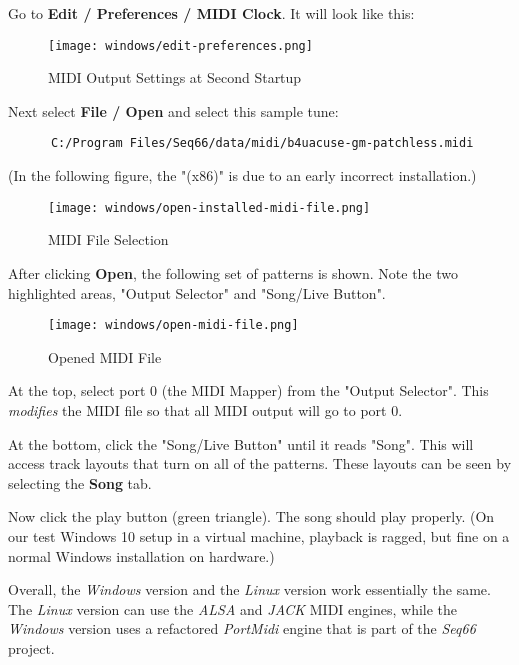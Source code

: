    Go to \textbf{Edit / Preferences / MIDI Clock}.
   It will look like this:

\begin{figure}[H]
   \centering 
   \texttt{[image: windows/edit-preferences.png]}
   \caption{MIDI Output Settings at Second Startup}
   \label{fig:windows_output_settings_second_startup}
\end{figure}

   Next select \textbf{File / Open} and select this sample tune:

   \begin{verbatim}
      C:/Program Files/Seq66/data/midi/b4uacuse-gm-patchless.midi
   \end{verbatim}

   (In the following figure, the "(x86)" is due to an early incorrect
   installation.)

\begin{figure}[H]
   \centering 
   \texttt{[image: windows/open-installed-midi-file.png]}
   \caption{MIDI File Selection}
   \label{fig:windows_open_installed_midi_file}
\end{figure}

   After clicking \textbf{Open}, the following set of patterns is shown.
   Note the two highlighted areas, "Output Selector" and "Song/Live Button".

\begin{figure}[H]
   \centering 
   \texttt{[image: windows/open-midi-file.png]}
   \caption{Opened MIDI File}
   \label{fig:windows_open_midi_file}
\end{figure}

   At the top, select port 0 (the MIDI Mapper) from the "Output Selector".
   This \textsl{modifies} the MIDI file so that all MIDI
   output will go to port 0.

   At the bottom, click the "Song/Live Button" until it reads "Song".
   This will access track layouts that turn on all of the patterns.
   These layouts can be seen by selecting the \textbf{Song} tab.

   Now click the play button (green triangle).
   The song should play properly.
   (On our test Windows 10 setup in a virtual machine, playback is ragged,
   but fine on a normal Windows installation on hardware.)

   Overall, the \textsl{Windows} version and the \textsl{Linux} version
   work essentially the same. The \textsl{Linux} version can use the
   \textsl{ALSA} and \textsl{JACK} MIDI engines, while the \textsl{Windows}
   version uses a refactored \textsl{PortMidi} engine that is part of the
   \textsl{Seq66} project.

